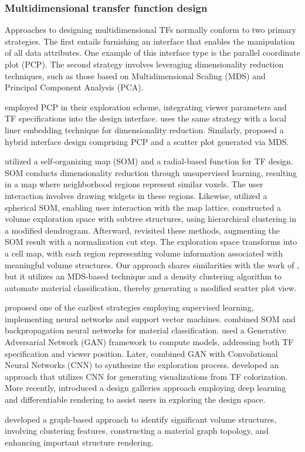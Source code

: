 \subsubsection{Multidimensional transfer function design}


Approaches to designing multidimensional TFs normally conform to two primary strategies. The first entails furnishing an interface that enables the manipulation of all data attributes. One example of this interface type is the parallel coordinate plot (PCP). The second strategy involves leveraging dimensionality reduction techniques, such as those based on Multidimensional Scaling (MDS) and Principal Component Analysis (PCA).

\cite{tory2005} employed PCP in their exploration scheme, integrating viewer parameters and TF specifications into the design interface. \cite{zhao2010} uses the same strategy with a local liner embedding technique for dimensionality reduction. Similarly, \cite{guo2011} proposed a hybrid interface design comprising PCP and a scatter plot generated via MDS.

\cite{moura2007} utilized a self-organizing map (SOM) and a radial-based function for TF design. SOM conducts dimensionality reduction through unsupervised learning, resulting in a map where neighborhood regions represent similar voxels. The user interaction involves drawing widgets in these regions. Likewise, \cite{khan2015} utilized a spherical SOM, enabling user interaction with the map lattice. \cite{wang2011} constructed a volume exploration space with subtree structures, using hierarchical clustering in a modified dendrogram. Afterward, \cite{cai2017} revisited these methods, augmenting the SOM result with a normalization cut step. The exploration space transforms into a cell map, with each region representing volume information associated with meaningful volume structures. Our approach shares similarities with the work of \cite{cai2017}, but it utilizes an MDS-based technique and a density clustering algorithm to automate material classification, thereby generating a modified scatter plot view.

\cite{tzeng2005} proposed one of the earliest strategies employing supervised learning, implementing neural networks and support vector machines. \cite{wang2006} combined SOM and backpropagation neural networks for material classification. \cite{berger2018} used a Generative Adversarial Network (GAN) framework to compute models, addressing both TF specification and viewer position. Later, \cite{hong2019} combined GAN with Convolutional Neural Networks (CNN) to synthesize the exploration process. \cite{kim2021} developed an approach that utilizes CNN for generating visualizations from TF colorization. More recently, \cite{pan2024} introduced a design galleries approach employing deep learning and differentiable rendering to assist users in exploring the design space.

\cite{sharma2020} developed a graph-based approach to identify significant volume structures, involving clustering features, constructing a material graph topology, and enhancing important structure rendering.